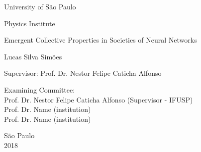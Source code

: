 
\pagestyle{empty}

\begin{center}
{\fontsize{16}{16} \selectfont University of São Paulo \\}

\vspace{0.1cm}

{\fontsize{16}{16} \selectfont Physics Institute}

\vspace{3.3cm}

{\fontsize{22}{22}\selectfont Emergent Collective Properties in Societies of Neural Networks \par}

\vspace{2cm}

{\fontsize{18}{18}\selectfont Lucas Silva Simões \par}

\vspace{2cm}

\end{center}

\leftskip 4cm

\begin{flushright}
\leftskip 4cm
Supervisor: Prof. Dr. Nestor Felipe Caticha Alfonso
\end{flushright}

\vspace{0.8cm}

\par
\leftskip 4cm

\par

\leftskip 0cm

\vskip 1.5cm

\noindent Examining Committee: \\
\noindent Prof. Dr. Nestor Felipe Caticha Alfonso (Supervisor - IFUSP)\\
Prof. Dr. Name (institution)\\
Prof. Dr. Name (institution)\\
\vspace{1.cm}

\begin{center}
	São Paulo \\ 2018
\end{center}

